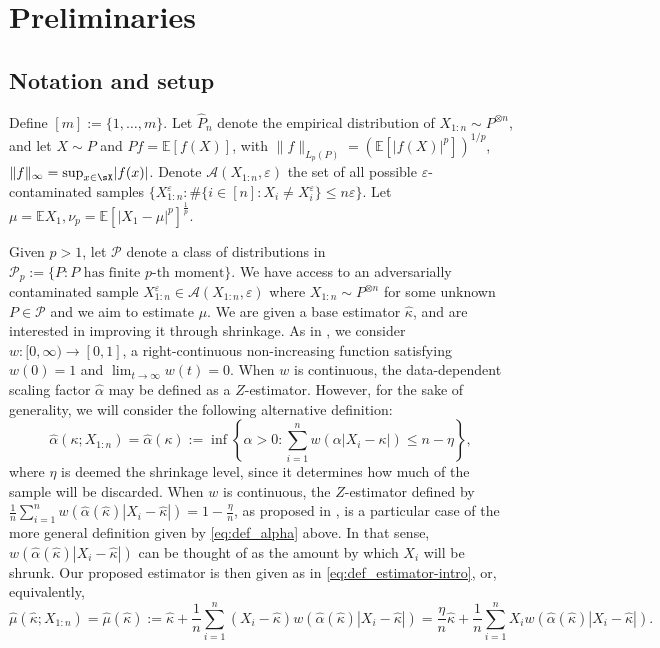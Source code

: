 \documentclass{article}
\theoremstyle{plain}
\theoremstyle{definition}
\newcommand{\E}{\mathbb{E}} %
\def\sA{\mathcal{A}}
\def\sP{\mathcal{P}}\def\sQ{\mathcal{Q}}\def\sR{\mathcal{R}}
\begin{document}
\section{Preliminaries}\label{sec:largefamily}

\subsection{Notation and setup} Define \( [m]:=\{1,\ldots,m\}  \). Let $\widehat{P}_n$ denote the empirical distribution of $X_{1:n}\sim P^{\otimes n}$, and let $X\sim P$ and $Pf = \E[f(X)]$, with $\lVert f\rVert_{L_p(P)}=(\E[\lvert f(X)\rvert ^p])^{1/p}$, $\lVert f\rVert_{\infty}=\sup_{x\in\sX}\lvert f(x)\rvert $. Denote \( \sA(X_{1:n},\varepsilon ) \) the set of all possible \( \varepsilon \)-contaminated samples \( \{X_{1:n}^\varepsilon : \#\{i \in [n]: X_i \neq X_i^\varepsilon \}\le n \varepsilon  \}  \). Let \( \mu = \mathbb{E}X_1, \nu_p = \mathbb{E}\left[\lvert X_1-\mu  \rvert^p  \right]^{\frac{1}{p}} \).    

Given $p>1$, let $\sP$ denote a class of distributions in $\sP_p:=\{P: P\text{ has finite }p\text{-th moment}\}$. We have access to an adversarially contaminated sample \( X_{1:n}^\varepsilon  \in \sA(X_{1:n},\varepsilon ) \) 
where $X_{1:n}\sim P^{\otimes n}$ for some unknown $P\in\sP$ and we aim to estimate $\mu$. We are given a base estimator $\widehat{\kappa}$, and are interested in improving it through shrinkage. As in , we consider $w : [0,\infty) \to [0,1]$, a right-continuous non-increasing function satisfying $w(0) = 1$ and $\lim_{t\to\infty}w(t)=0$. When \( w \) is continuous, the data-dependent scaling factor \( \widehat{\alpha} \) may be defined as a $Z$-estimator. However, for the sake of generality, we will consider the following alternative definition:
\begin{equation}
	\label{eq:def_alpha}
  \widehat{\alpha}(\kappa; X_{1:n})= \widehat{\alpha}(\kappa) := \inf\left\{ \alpha > 0 : \sum_{i=1}^n w(\alpha |X_i-\kappa|) \leq n - \eta \right\},
\end{equation}
where \( \eta \) is deemed the shrinkage level, since it determines how much of the sample will be discarded. When \( w \) is continuous, the $Z$-estimator defined by $\frac{1}{n}\sum_{i=1}^n w(\widehat{\alpha}(\widehat{\kappa } )|X_i - \widehat{\kappa}|) = 1 - \frac{\eta}{n}$, as proposed in , is a particular case of the more general definition given by \eqref{eq:def_alpha} above. In that sense, $w(\widehat{\alpha}(\widehat{\kappa } )|X_i - \widehat{\kappa}|)$ can be thought of as the amount by which $X_i$ will be shrunk. Our proposed estimator is then given as in \eqref{eq:def_estimator-intro}, or, equivalently,
\begin{equation}
	\label{eq:def_estimator}
  \widehat{\mu}(\widehat{\kappa }; X_{1:n} )=\widehat{\mu}(\widehat{\kappa } )
    := \widehat{\kappa} + \frac{1}{n}\sum_{i=1}^n(X_i - \widehat{\kappa})w(\widehat{\alpha}(\widehat{\kappa } )|X_i-\widehat{\kappa}|)
    =\frac{\eta}{n}\widehat{\kappa} + \frac{1}{n}\sum_{i=1}^n X_i w(\widehat{\alpha}(\widehat{\kappa } ) |X_i-\widehat{\kappa}|).
\end{equation}
\end{document}
